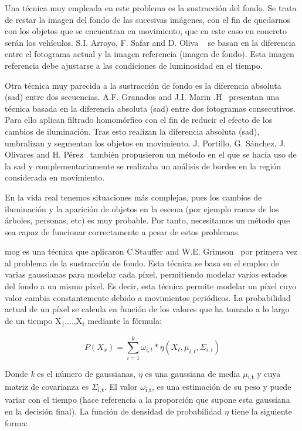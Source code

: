 Una técnica muy empleada en este problema es la sustracción del fondo. Se trata de restar la imagen del fondo de las sucesivas imágenes, con el fin de quedarnos con los objetos que se encuentran en movimiento, que en este caso en concreto serán los vehículos. S.I. Arroyo, F. Safar and D. Oliva ~\cite{probabilidad_infraccion}
 se basan en la diferencia entre el fotograma actual y la imagen referencia (imagen de fondo). Esta imagen referencia debe ajustarse a las condiciones de luminosidad en el tiempo.
 
 Otra técnica muy parecida a la sustracción de fondo es la diferencia absoluta (\acrfull{sad}) entre dos secuencias. A.F. Granados and J.I. Marin .H~\cite{deteccion_flujo_vehicular} presentan una técnica basada  en la diferencia absoluta (\acrshort{sad}) entre dos fotogramas consecutivos. Para ello aplican filtrado homomórfico con el fin de reducir el efecto de los cambios de iluminación. Tras esto realizan la diferencia absoluta (\acrshort{sad}), umbralizan y segmentan los objetos en movimiento. J. Portillo, G. Sánchez, J. Olivares and H. Pérez~\cite{deteccion_movimiento} también propusieron un método en el que se hacía uso de la \acrshort{sad} y complementariamente se realizaba un análisis de bordes en la región considerada en movimiento.

En la vida real tenemos situaciones más complejas, pues los cambios de iluminación y la aparición de objetos en la escena (por ejemplo ramas de los árboles, personas, etc) es muy probable. Por tanto, necesitamos un método que sea capaz de funcionar correctamente a pesar de estos problemas.

\acrfull{mog} es una técnica que aplicaron C.Stauffer and  W.E.  Grimson~\cite{adaptative_background} por primera vez al problema de la sustracción de fondo. Esta técnica se basa en el empleo de varias gaussianas para modelar cada píxel, permitiendo modelar varios estados del fondo a un mismo píxel. Es decir, esta técnica permite modelar un píxel cuyo valor cambia constantemente debido a movimientos periódicos.  La probabilidad actual de un píxel se calcula en función de los valores que ha tomado a lo largo de un tiempo X\textsubscript{1},...,X\textsubscript{t} mediante la fórmula:

\begin{equation}\label{gmm_formula}
P(X_{x}) = \sum_{i=1}^{k}\omega_{i,t}*\eta(X_{t},\mu_{i,t},\Sigma_{i,t}) 
\end{equation}

Donde \textit{k} es el número de gaussianas, $\eta$ es  una  gaussiana  de  media $\mu$\textsubscript{i,t} y cuya matriz de covarianza es $\Sigma$\textsubscript{i,t}. El valor $\omega$\textsubscript{i,t}, es una estimación de su peso y puede variar con el tiempo (hace referencia a la proporción que supone esta gaussiana en la decisión final). La función de densidad de probabilidad $\eta$ tiene la siguiente forma:

